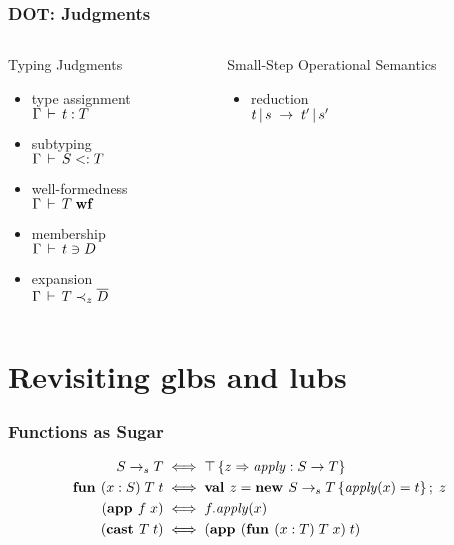 \documentclass{beamer}
\begin{document}
\begin{frame}[fragile]
\frametitle{DOT: Judgments}
\begin{columns}
\begin{column}[t]{5cm}
\begin{block}{Typing Judgments}
\begin{itemize}
\item type assignment\\$\Gamma \,\vdash\, t : T$
\item subtyping\\$\Gamma \,\vdash\, S <: T$
\item well-formedness\\$\Gamma \,\vdash\, T \;\mbox{\textbf{wf}}$
\item membership\\$\Gamma \,\vdash\, t \ni D$
\item expansion\\$\Gamma \,\vdash\, T \prec_z \overline{D}$
\end{itemize}
\end{block}
\end{column}
\begin{column}[t]{5cm}
\begin{block}{Small-Step Operational Semantics}
\begin{itemize}
\item reduction\\$t \operatorname{|} s \;\rightarrow\; t' \operatorname{|} s'$
\end{itemize}
\end{block}
\end{column}
\end{columns}
\end{frame}

\section{Revisiting glbs and lubs}

\begin{frame}[fragile]
\frametitle{Functions as Sugar}
\begin{align*}
S\rightarrow_sT &\iff {\top\left\{z \Rightarrow \mathit{apply} : S \rightarrow T \right\}}\\
\textbf{fun } (x:S)\;T\;t &\iff \textbf{val }z = \textbf{new }{S\rightarrow_sT}\left\{\mathit{apply}(x) = t\right\} ;\; z\\
(\textbf{app }f\;x) &\iff f.\mathit{apply}(x)\\
(\textbf{cast }T\;t)&\iff (\textbf{app }(\textbf{fun } (x:T)\;T\;x)\;t)
\end{align*}
\end{frame}
\end{document}
